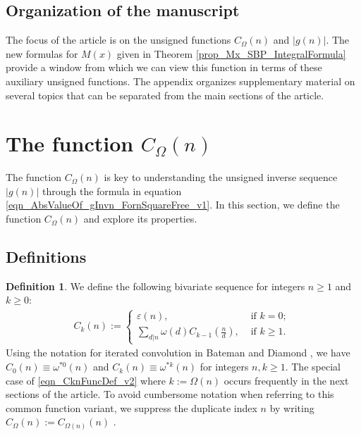 \documentclass[11pt,reqno,a4letter]{article}
\newcommand{\hlocalref}[1]{\hyperref[#1]{\ref{#1}}}
\numberwithin{equation}{section}
\numberwithin{figure}{section}
\numberwithin{table}{section}
\newcommand{\seqnum}[1]{\href{http://oeis.org/#1}{\color{ProcessBlue}{\underline{#1}}}}
\theoremstyle{plain}
\numberwithin{theorem}{section}
\theoremstyle{definition}
\newtheorem{definition}[theorem]{Definition}
\theoremstyle{remark}
\begin{document}
\subsection{Organization of the manuscript}

The focus of the article is on the unsigned functions 
$C_{\Omega}(n)$ and $|g(n)|$. 
The new formulas for $M(x)$ given in 
Theorem \hlocalref{prop_Mx_SBP_IntegralFormula} 
provide a window from which we can view this function in terms of these 
auxiliary unsigned functions. 
The appendix organizes supplementary material on several 
topics that can be separated from the main sections of the article. 

\section{The function $C_{\Omega}(n)$} 
\label{Section_NewFormulasForgInvn_v1} 

The function $C_{\Omega}(n)$ is key to understanding the 
unsigned inverse sequence $|g(n)|$ through the formula in equation 
\eqref{eqn_AbsValueOf_gInvn_FornSquareFree_v1}. 
In this section, we define the function 
$C_{\Omega}(n)$ and explore its properties. 

\subsection{Definitions}

\begin{definition}
We define the following bivariate sequence for integers $n \geq 1$ and $k \geq 0$: 
\begin{align} 
\label{eqn_CknFuncDef_v2} 
C_k(n) := \begin{cases} 
     \varepsilon(n), & \text{ if $k = 0$; } \\ 
     \sum\limits_{d|n} \omega(d) C_{k-1}\left(\frac{n}{d}\right), & \text{ if $k \geq 1$. } 
     \end{cases} 
\end{align} 
Using the notation for iterated convolution in 
Bateman and Diamond \cite[Def.~2.3; \S 2]{ANT-BATEMAN-DIAMOND}, we have 
$C_0(n) \equiv \omega^{\ast 0}(n)$ and $C_k(n) \equiv \omega^{\ast k}(n)$ for 
integers $n, k \geq 1$. 
The special case of \eqref{eqn_CknFuncDef_v2} where 
$k := \Omega(n)$ occurs frequently in the next sections of the 
article. To avoid cumbersome notation when referring to this common function variant, we suppress the 
duplicate index $n$ by writing $C_{\Omega}(n) := C_{\Omega(n)}(n)$ \cite[\seqnum{A008480}]{OEIS}. 
\end{definition}
\end{document}
